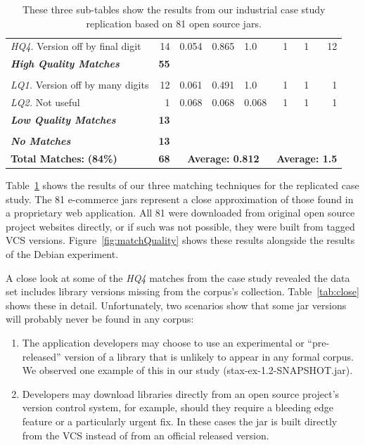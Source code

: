 \begin{table}[h]
\begin{tabular}[htbp]{l|r|lll|rrr}
  \emph{HQ4.} Version off by final digit &  14          & 0.054 & 0.865  & 1.0   & 1    & 1    & 12   \\
  \emph{\textbf{High Quality Matches}}   & \textbf{55}  &       &        &       &      &      &      \\
& & & & & & & \\
  \emph{LQ1.} Version off by many digits &  12          & 0.061 & 0.491  & 1.0   & 1    & 1    &  1   \\
  \emph{LQ2.} Not useful                 &   1          & 0.068 & 0.068  & 0.068 & 1    & 1    &  1   \\
  \emph{\textbf{Low Quality Matches}}    & \textbf{13}  &       &        &       &      &      &      \\
& & & & & & & \\
  \emph{\textbf{No Matches}}             & \textbf{13}  &       &        &       &      &      &      \\
  \hline
  \textbf{Total Matches:} \hspace{3em}    \textbf{(84\%)} &  \textbf{68}   & \multicolumn{3}{c|}{\textbf{Average: 0.812}}  & \multicolumn{3}{c}{\textbf{Average: 1.5}} \\
\end{tabular}
  \caption{These three sub-tables show the results from our industrial case
      study replication based on 81 open source jars.}
  \label{tab:bank}
\end{table}

Table~\ref{tab:bank} shows the results of our three matching techniques for
the replicated case study.  The 81 e-commerce jars represent a close
approximation of those found in a proprietary web application.  All 81 were
downloaded from original open source project websites directly, or if such was not
possible, they were built from tagged VCS versions.
Figure~\ref{fig:matchQuality} shows these results alongside the results of
the Debian experiment.

A close look at some of the \emph{HQ4} matches from the case study revealed
the data set includes library versions missing from the corpus's
collection.  Table~\ref{tab:close} shows these in detail.  Unfortunately,
two scenarios show that some jar versions will probably never be found in
any corpus:

\begin{enumerate}

\item The application developers may choose to use an experimental or
    ``pre-released'' version of a library that is unlikely to appear in any
    formal corpus.  We observed one example of this in our study
    (stax-ex-1.2-SNAPSHOT.jar).

\item Developers may download libraries directly from an open source
    project's version control system, for example, should they require a
    bleeding edge feature or a particularly urgent fix.  In these cases the
    jar is built directly from the VCS instead of from an official released
    version.

\end{enumerate}


